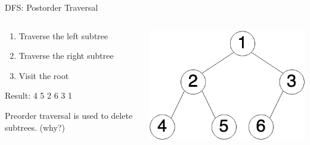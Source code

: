 \documentclass[
  ignorenonframetext,
]{beamer}
\begin{document}
\begin{frame}{DFS: Postorder Traversal}
\protect\hypertarget{dfs-postorder-traversal}{}
\begin{columns}[T]
\begin{column}{0.6\textwidth}
\begin{enumerate}
\item
  Traverse the left subtree
\item
  Traverse the right subtree
\item
  Visit the root
\end{enumerate}

\vspace{1cm}

Result: 4 5 2 6 3 1

Preorder traversal is used to delete subtrees. (why?)
\end{column}

\begin{column}{0.4\textwidth}
\includegraphics{images/tree-num.png}
\end{column}
\end{columns}
\end{frame}
\end{document}

